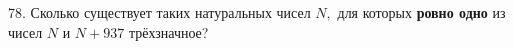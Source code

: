 78. Сколько существует таких натуральных чисел $N,$ для которых {\bf ровно одно} из чисел $N$ и $N+937$ трёхзначное?\\
